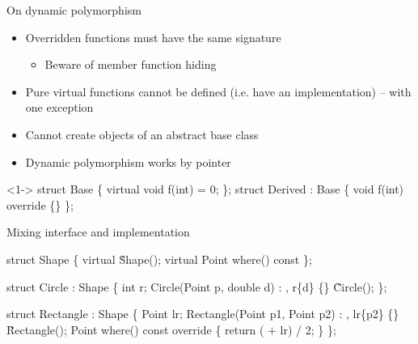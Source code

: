 \begin{frame}[fragile]{On dynamic polymorphism}

  \begin{itemize}
  \item Overridden functions must have the same signature
    \begin{itemize}
    \item Beware of member function hiding
    \end{itemize}
  \item<2-> Pure virtual functions cannot be defined (i.e. have an implementation)
    -- with one exception
  \item<2-> Cannot create objects of an abstract base class
  \item<3-> Dynamic polymorphism works by pointer
  \end{itemize}

  \begin{codeblock}<1->
struct Base \{ virtual \alert<1>{void f(int)} = 0; \};
struct Derived : Base \{ \alert<1>{void f(int)} override \{\} \};

\end{codeblock}

\end{frame}
\begin{frame}[fragile]{Mixing interface and implementation}

  \begin{codeblock}
struct Shape \{
  virtual \~Shape();
  virtual Point where() const 
\};

struct Circle : Shape \{
  int r;
  Circle(Point p, double d) : , r\{d\} \{\}
  \~Circle();
\};

struct Rectangle : Shape \{
  Point lr;
  Rectangle(Point p1, Point p2) : , lr\{p2\} \{\}
  \~Rectangle();
  Point where() const override \{ return ( + lr) / 2; \}
\};\end{codeblock}


\end{frame}

